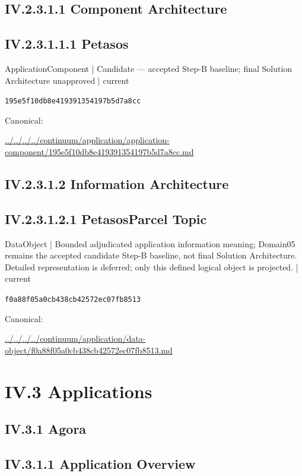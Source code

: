 \documentclass[10pt,a4paper]{article}
\begin{document}
\subsection*{IV.2.3.1.1 Component Architecture}
\subsection*{IV.2.3.1.1.1 Petasos}
\label{element-195e5f10db8e419391354197b5d7a8cc}
{\small ApplicationComponent | Candidate — accepted Step-B baseline; final Solution Architecture unapproved | current}\par
\texttt{195e5f10db8e419391354197b5d7a8cc}\par
Canonical: \par
{\footnotesize\url{../../../../continuum/application/application-component/195e5f10db8e419391354197b5d7a8cc.md}}\par
\subsection*{IV.2.3.1.2 Information Architecture}
\subsection*{IV.2.3.1.2.1 PetasosParcel Topic}
\label{element-f0a88f05a0cb438cb42572ec07fb8513}
{\small DataObject | Bounded adjudicated application information meaning; Domain05 remains the accepted candidate Step-B baseline, not final Solution Architecture. Detailed representation is deferred; only this defined logical object is projected. | current}\par
\texttt{f0a88f05a0cb438cb42572ec07fb8513}\par
Canonical: \par
{\footnotesize\url{../../../../continuum/application/data-object/f0a88f05a0cb438cb42572ec07fb8513.md}}\par
\section*{IV.3 Applications}
\subsection*{IV.3.1 Agora}
\subsection*{IV.3.1.1 Application Overview}
\end{document}

